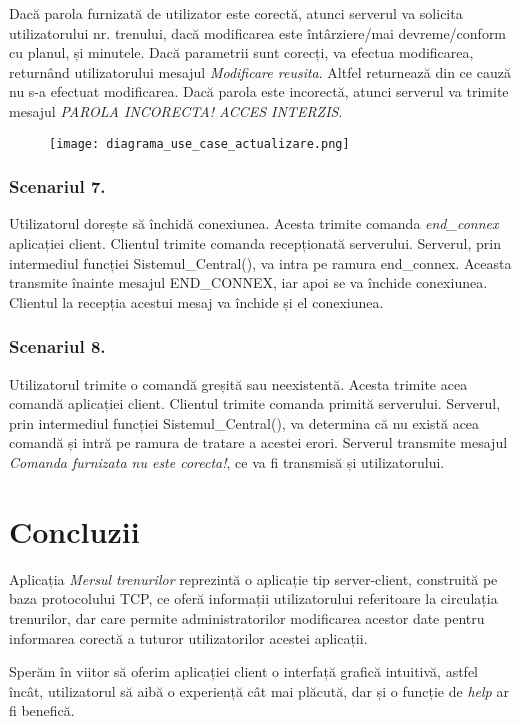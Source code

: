 \documentclass[runningheads]{llncs}
\begin{document}
Dacă parola furnizată de utilizator este corectă, atunci serverul va solicita utilizatorului nr. trenului, dacă modificarea este întârziere/mai devreme/conform cu planul, și minutele. Dacă parametrii sunt corecți, va efectua modificarea, returnând utilizatorului mesajul \textit{Modificare reusita}. Altfel returnează din ce cauză nu s-a efectuat modificarea. Dacă parola este incorectă, atunci serverul va trimite mesajul \textit{PAROLA INCORECTA! ACCES INTERZIS}. 
 \begin{figure}[H]
     \centering
     \texttt{[image: diagrama\_use\_case\_actualizare.png]}
 \end{figure}
 \subsubsection{Scenariul 7.}
 Utilizatorul dorește să închidă conexiunea. Acesta trimite comanda \textit{end\_connex} aplicației client. Clientul trimite comanda recepționată serverului. Serverul, prin intermediul funcției Sistemul\_Central(), va intra pe ramura end\_connex. Aceasta transmite înainte mesajul END\_CONNEX, iar apoi se va închide conexiunea. Clientul la recepția acestui mesaj va închide și el conexiunea.
 
 \subsubsection{Scenariul 8.}
 Utilizatorul trimite o comandă greșită sau neexistentă. Acesta trimite acea comandă aplicației client. Clientul trimite comanda primită serverului. Serverul, prin intermediul funcției Sistemul\_Central(), va determina că nu există acea comandă și intră pe ramura de tratare a acestei erori. Serverul transmite mesajul \textit{Comanda furnizata nu este corecta!}, ce va fi transmisă și utilizatorului. 

\section{Concluzii}

Aplicația \textit{Mersul trenurilor} reprezintă o aplicație tip server-client, construită pe baza protocolului TCP, ce oferă informații utilizatorului referitoare la circulația trenurilor, dar care permite administratorilor modificarea acestor date pentru informarea corectă a tuturor utilizatorilor acestei aplicații.  

Sperăm în viitor să oferim aplicației client o interfață grafică intuitivă, astfel încât, utilizatorul să aibă o experiență cât mai plăcută, dar și o funcție de \textit{help} ar fi  benefică.
\end{document}
